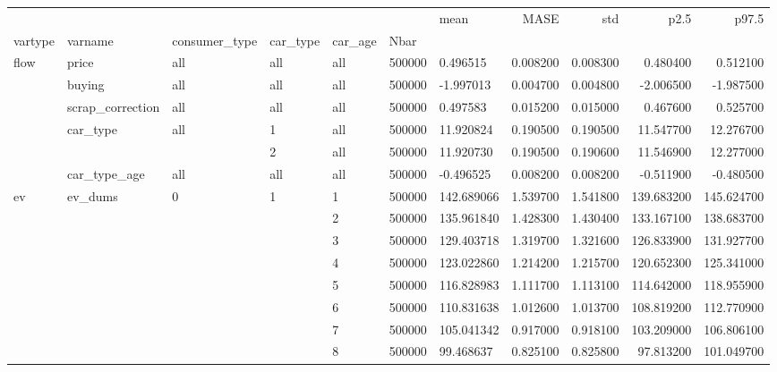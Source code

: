 \begin{tabular}{lllllllrrrr}
\toprule
 &  &  &  &  &  & mean & MASE & std & p2.5 & p97.5 \\
vartype & varname & consumer_type & car_type & car_age & Nbar &  &  &  &  &  \\
\midrule
\multirow[t]{6}{*}{flow} & price & all & all & all & 500000 & 0.496515 & 0.008200 & 0.008300 & 0.480400 & 0.512100 \\
\cline{2-11} \cline{3-11} \cline{4-11} \cline{5-11}
 & buying & all & all & all & 500000 & -1.997013 & 0.004700 & 0.004800 & -2.006500 & -1.987500 \\
\cline{2-11} \cline{3-11} \cline{4-11} \cline{5-11}
 & scrap_correction & all & all & all & 500000 & 0.497583 & 0.015200 & 0.015000 & 0.467600 & 0.525700 \\
\cline{2-11} \cline{3-11} \cline{4-11} \cline{5-11}
 & \multirow[t]{2}{*}{car_type} & \multirow[t]{2}{*}{all} & 1 & all & 500000 & 11.920824 & 0.190500 & 0.190500 & 11.547700 & 12.276700 \\
\cline{4-11} \cline{5-11}
 &  &  & 2 & all & 500000 & 11.920730 & 0.190500 & 0.190600 & 11.546900 & 12.277000 \\
\cline{2-11} \cline{3-11} \cline{4-11} \cline{5-11}
 & car_type_age & all & all & all & 500000 & -0.496525 & 0.008200 & 0.008200 & -0.511900 & -0.480500 \\
\cline{1-11} \cline{2-11} \cline{3-11} \cline{4-11} \cline{5-11}
\multirow[t]{51}{*}{ev} & \multirow[t]{51}{*}{ev_dums} & \multirow[t]{51}{*}{0} & \multirow[t]{25}{*}{1} & 1 & 500000 & 142.689066 & 1.539700 & 1.541800 & 139.683200 & 145.624700 \\
\cline{5-11}
 &  &  &  & 2 & 500000 & 135.961840 & 1.428300 & 1.430400 & 133.167100 & 138.683700 \\
\cline{5-11}
 &  &  &  & 3 & 500000 & 129.403718 & 1.319700 & 1.321600 & 126.833900 & 131.927700 \\
\cline{5-11}
 &  &  &  & 4 & 500000 & 123.022860 & 1.214200 & 1.215700 & 120.652300 & 125.341000 \\
\cline{5-11}
 &  &  &  & 5 & 500000 & 116.828983 & 1.111700 & 1.113100 & 114.642000 & 118.955900 \\
\cline{5-11}
 &  &  &  & 6 & 500000 & 110.831638 & 1.012600 & 1.013700 & 108.819200 & 112.770900 \\
\cline{5-11}
 &  &  &  & 7 & 500000 & 105.041342 & 0.917000 & 0.918100 & 103.209000 & 106.806100 \\
\cline{5-11}
 &  &  &  & 8 & 500000 & 99.468637 & 0.825100 & 0.825800 & 97.813200 & 101.049700 \\

\end{tabular}
